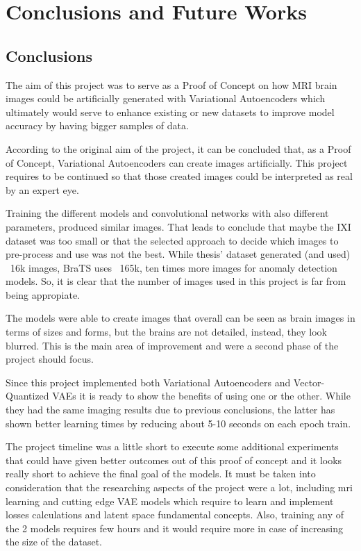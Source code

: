 \chapter{Conclusions and Future Works}

\section{Conclusions}

The aim of this project was to serve as a Proof of Concept on how MRI brain images could be artificially generated with Variational Autoencoders which ultimately would serve to enhance existing or new datasets to improve model accuracy by having bigger samples of data.

According to the original aim of the project, it can be concluded that, as a Proof of Concept, Variational Autoencoders can create images artificially. This project requires to be continued so that those created images could be interpreted as real by an expert eye.

Training the different models and convolutional networks with also different parameters, produced similar images. That leads to conclude that maybe the IXI dataset was too small or that the selected approach to decide which images to pre-process and use was not the best. While thesis' dataset generated (and used) ~16k images, BraTS \cite{brats} uses ~165k, ten times more images for anomaly detection models. So, it is clear that the number of images used in this project is far from being appropiate.

The models were able to create images that overall can be seen as brain images in terms of sizes and forms, but the brains are not detailed, instead, they look blurred. This is the main area of improvement and were a second phase of the project should focus.

Since this project implemented both Variational Autoencoders and Vector-Quantized VAEs it is ready to show the benefits of using one or the other. While they had the same imaging results due to previous conclusions, the latter has shown better learning times by reducing about 5-10 seconds on each epoch train.

The project timeline was a little short to execute some additional experiments that could have given better outcomes out of this proof of concept and it looks really short to achieve the final goal of the models. It must be taken into consideration that the researching aspects of the project were a lot, including \acrshort{mri} learning and cutting edge VAE models which require to learn and implement losses calculations and latent space fundamental concepts. Also, training any of the 2 models requires few hours and it would require more in case of increasing the size of the dataset.

